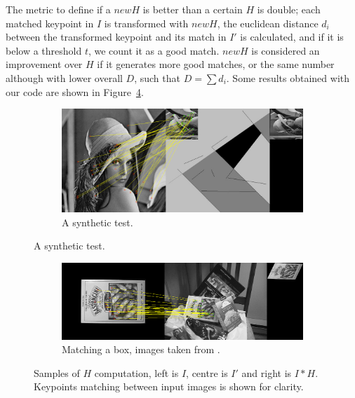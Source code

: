 \documentclass[12pt]{article}
\begin{document}
The metric to define if a $newH$ is better than a certain $H$ is double; each matched keypoint in $I$ is transformed with $newH$, the euclidean distance $d_i$ between the transformed keypoint and its match in $I'$ is calculated, and if it is below a threshold $t$, we count it as a good match.
$newH$ is considered an improvement over $H$ if it generates more good matches, or the same number although with lower overall $D$, such that $D = \sum d_i $.
Some results obtained with our code are shown in Figure~\ref{fig:ransacSample}.

\begin{figure}[htbp!]
        \centering
        \begin{subfigure}[b]{0.8\textwidth}
                \includegraphics[width=\textwidth]{images/ransac2}
                \caption{A synthetic test.}
                \label{fig:ransac1}
        \end{subfigure}    
\end{figure}

\begin{figure}[htbp]
		\ContinuedFloat
		\centering        
        \begin{subfigure}[b]{0.8\textwidth}
                \includegraphics[width=\textwidth]{images/ransac1}
                \caption{Matching a box, images taken from \cite{Lowe2004}.}
                \label{fig:ransac2}
        \end{subfigure} 
        \caption{Samples of $H$ computation, left is $I$, centre is $I'$ and right is $I * H$. Keypoints matching between input images is shown for clarity.}\label{fig:ransacSample}
\end{figure}
\end{document}
